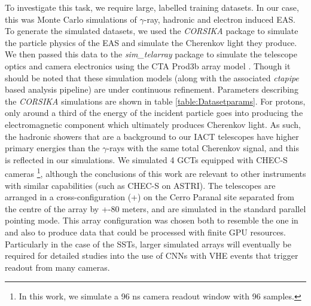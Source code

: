 To investigate this task, we require large, labelled training datasets. In our case, this was Monte Carlo simulations of $\gamma$-ray, hadronic and electron induced EAS. To generate the simulated datasets, we used the \textit{CORSIKA} package \cite{corsika} to simulate the particle physics of the EAS and simulate the Cherenkov light they produce. We then passed this data to the \textit{sim\_telarray} package \cite{BERNLOHR} to simulate the telescope optics and camera electronics using the CTA Prod3b array model \cite{prod3b}. Though it should be noted that these simulation models (along with the associated \textit{ctapipe} based analysis pipeline) are under continuous refinement. Parameters describing the \textit{CORSIKA} simulations are shown in table \ref{table:Datasetparams}. For protons, only around a third of the energy of the incident particle goes into producing the electromagnetic component which ultimately produces Cherenkov light. As such, the hadronic showers that are a background to our IACT telescopes have higher primary energies than the $\gamma$-rays with the same total Cherenkov signal, and this is reflected in our simulations. We simulated 4 GCTs \cite{gct} equipped with CHEC-S cameras \footnote{In this work, we simulate a 96 ns camera readout window with 96 samples.}, although the conclusions of this work are relevant to other instruments with similar capabilities (such as CHEC-S on ASTRI). The telescopes are arranged in a cross-configuration (+) on the Cerro Paranal site separated from the centre of the array by +-80 meters, and are simulated in the standard parallel pointing mode. This array configuration was chosen both to resemble the one in \cite{Shilon} and also to produce data that could be processed with finite GPU resources. Particularly in the case of the SSTs, larger simulated arrays will eventually be required for detailed studies into the use of CNNs with VHE events that trigger readout from many cameras.

